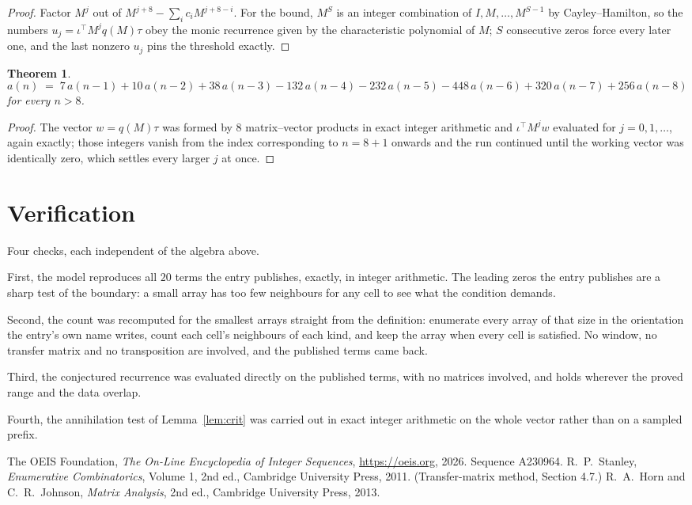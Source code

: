\documentclass[11pt,a4paper]{article}
\theoremstyle{plain}
\newtheorem{theorem}{Theorem}
\theoremstyle{definition}
\begin{document}
\begin{proof}
Factor $M^{j}$ out of $M^{j+8}-\sum_ic_iM^{j+8-i}$. For the bound, $M^{S}$
is an integer combination of $I,M,\dots,M^{S-1}$ by Cayley--Hamilton, so the numbers
$u_j=\iota^{\!\top}M^{j}q(M)\tau$ obey the monic recurrence given by the characteristic
polynomial of $M$; $S$ consecutive zeros force every later one, and the last nonzero $u_j$
pins the threshold exactly.
\end{proof}

\begin{theorem}
\[
a(n)\;=\;7\,a(n-1) + 10\,a(n-2) + 38\,a(n-3) - 132\,a(n-4) - 232\,a(n-5) - 448\,a(n-6) + 320\,a(n-7) + 256\,a(n-8)
\]
for every $n>8$.
\end{theorem}

\begin{proof}
The vector $w=q(M)\tau$ was formed by $8$ matrix--vector products in exact integer
arithmetic and $\iota^{\!\top}M^{j}w$ evaluated for $j=0,1,\dots$, again exactly; those
integers vanish from the index corresponding to $n=8+1$ onwards and the run continued
until the working vector was identically zero, which settles every larger $j$ at once.
\end{proof}

\section{Verification}

Four checks, each independent of the algebra above.

First, the model reproduces all $20$ terms the entry publishes, exactly, in integer
arithmetic. The leading zeros the entry publishes are a sharp test of the boundary: a small
array has too few neighbours for any cell to see what the condition demands.

Second, the count was recomputed for the smallest arrays straight from the definition:
enumerate every array of that size in the orientation the entry's own name writes, count each
cell's neighbours of each kind, and keep the array when every cell is satisfied. No window, no
transfer matrix and no transposition are involved, and the published terms came back.

Third, the conjectured recurrence was evaluated directly on the published terms, with no
matrices involved, and holds wherever the proved range and the data overlap.

Fourth, the annihilation test of Lemma~\ref{lem:crit} was carried out in exact integer
arithmetic on the whole vector rather than on a sampled prefix.

\begin{thebibliography}{9}
 The OEIS Foundation, \emph{The On-Line Encyclopedia of Integer
Sequences}, \url{https://oeis.org}, 2026. Sequence A230964.
 R.~P.~Stanley, \emph{Enumerative Combinatorics}, Volume 1, 2nd ed.,
Cambridge University Press, 2011. (Transfer-matrix method, Section 4.7.)
 R.~A.~Horn and C.~R.~Johnson, \emph{Matrix Analysis}, 2nd ed., Cambridge
University Press, 2013.
\end{thebibliography}
\end{document}

